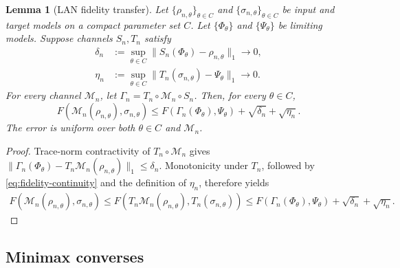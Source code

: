 \documentclass[11pt]{article}
\newtheorem{lemma}[lemma]{Lemma}
\theoremstyle{remark}
\theoremstyle{plain}
\newcommand{\cM}{\mathcal M}
\begin{document}
\begin{lemma}[LAN fidelity transfer]\label{lem:LAN-fidelity-transfer}
Let \(\{\rho_{n,\theta}\}_{\theta\in C}\) and
\(\{\sigma_{n,\theta}\}_{\theta\in C}\) be input and target models on a
compact parameter set \(C\).  Let \(\{\Phi_\theta\}\) and
\(\{\Psi_\theta\}\) be limiting models.  Suppose channels \(S_n,T_n\)
satisfy
\[
\begin{aligned}
  \delta_n&:=\sup_{\theta\in C}
    \|S_n(\Phi_\theta)-\rho_{n,\theta}\|_1\to0,\\
  \eta_n&:=\sup_{\theta\in C}
    \|T_n(\sigma_{n,\theta})-\Psi_\theta\|_1\to0.
\end{aligned}
\]
For every channel \(\cM_n\), let \(\Gamma_n=T_n\circ\cM_n\circ S_n\).
Then, for every \(\theta\in C\),
\begin{equation}\label{eq:LAN-transfer}
  F(\cM_n(\rho_{n,\theta}),\sigma_{n,\theta})
  \le F(\Gamma_n(\Phi_\theta),\Psi_\theta)
      +\sqrt{\delta_n}+\sqrt{\eta_n}.
\end{equation}
The error is uniform over both \(\theta\in C\) and \(\cM_n\).
\end{lemma}

\begin{proof}
Trace-norm contractivity of \(T_n\circ\cM_n\) gives
\(\|\Gamma_n(\Phi_\theta)-T_n\cM_n(\rho_{n,\theta})\|_1\le\delta_n\).
Monotonicity under \(T_n\), followed by
\eqref{eq:fidelity-continuity} and the definition of \(\eta_n\), therefore yields
\[
\begin{aligned}
  F(\cM_n(\rho_{n,\theta}),\sigma_{n,\theta})
  \le F(T_n\cM_n(\rho_{n,\theta}),T_n(\sigma_{n,\theta}))
  \le F(\Gamma_n(\Phi_\theta),\Psi_\theta)
       +\sqrt{\delta_n}+\sqrt{\eta_n}.
\end{aligned}
\]
\end{proof}

\subsection{Minimax converses}
\label{sec:minimax-completion}
\end{document}
